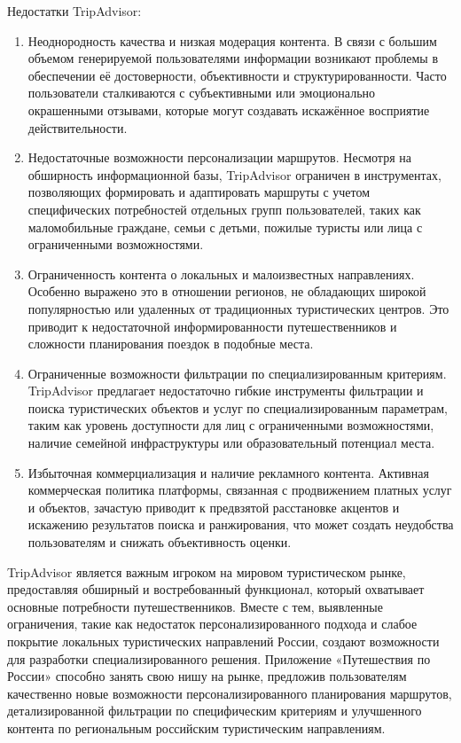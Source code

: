 Недостатки TripAdvisor:
\begin{enumerate}
    \item Неоднородность качества и низкая модерация контента. В связи с большим объемом генерируемой пользователями информации возникают проблемы в обеспечении её достоверности, объективности и структурированности. Часто пользователи сталкиваются с субъективными или эмоционально окрашенными отзывами, которые могут создавать искажённое восприятие действительности.
    \item Недостаточные возможности персонализации маршрутов. Несмотря на обширность информационной базы, TripAdvisor ограничен в инструментах, позволяющих формировать и адаптировать маршруты с учетом специфических потребностей отдельных групп пользователей, таких как маломобильные граждане, семьи с детьми, пожилые туристы или лица с ограниченными возможностями.
    \item Ограниченность контента о локальных и малоизвестных направлениях. Особенно выражено это в отношении регионов, не обладающих широкой популярностью или удаленных от традиционных туристических центров. Это приводит к недостаточной информированности путешественников и сложности планирования поездок в подобные места.
    \item Ограниченные возможности фильтрации по специализированным критериям. TripAdvisor предлагает недостаточно гибкие инструменты фильтрации и поиска туристических объектов и услуг по специализированным параметрам, таким как уровень доступности для лиц с ограниченными возможностями, наличие семейной инфраструктуры или образовательный потенциал места.
    \item Избыточная коммерциализация и наличие рекламного контента. Активная коммерческая политика платформы, связанная с продвижением платных услуг и объектов, зачастую приводит к предвзятой расстановке акцентов и искажению результатов поиска и ранжирования, что может создать неудобства пользователям и снижать объективность оценки.
\end{enumerate}

TripAdvisor является важным игроком на мировом туристическом рынке, предоставляя обширный и востребованный функционал, который охватывает основные потребности путешественников. Вместе с тем, выявленные ограничения, такие как недостаток персонализированного подхода и слабое покрытие локальных туристических направлений России, создают возможности для разработки специализированного решения. Приложение «Путешествия по России» способно занять свою нишу на рынке, предложив пользователям качественно новые возможности персонализированного планирования маршрутов, детализированной фильтрации по специфическим критериям и улучшенного контента по региональным российским туристическим направлениям.


